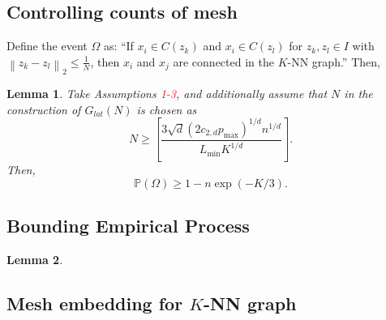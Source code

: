 \documentclass{article}
\newcommand{\norm}[1]{\left\lVert#1\right\rVert}
\newcommand{\1}{\mathbb{I}}
\newcommand{\Pbb}{\mathbb{P}}
\theoremstyle{alden}
\theoremstyle{aldenthm}
\newtheorem{lemma}{Lemma}
\theoremstyle{definition}
\theoremstyle{remark}
\begin{document}
\subsection{Controlling counts of mesh}

Define the event $\Omega$ as: ``If $x_i \in C(z_k)$ and $x_i \in C(z_l)$ for $z_k, z_l \in I$ with $\norm{z_k - z_l}_2 \leq \frac{1}{N}$, then $x_i$ and $x_j$ are connected in the $K$-NN graph.'' Then,
\begin{lemma}
	\label{lem: mesh_counts}
	Take Assumptions \textcolor{red}{1-3}, and additionally assume that $N$ in the construction of $G_{lat}(N)$ is chosen as
	\begin{equation}
	\label{eqn: N_lower_bound}
	N \geq \left[\frac{3\sqrt{d}(2 c_{2,d} p_{\max})^{1/d} n^{1/d}}{L_{\min} K^{1/d}}\right].
	\end{equation}
	Then,
	\begin{equation*}
	\Pbb(\Omega) \geq 1 - n \exp(-K / 3).
	\end{equation*}
\end{lemma}

\subsection{Bounding Empirical Process}

\begin{lemma}
	
\end{lemma}

\subsection{Mesh embedding for $K$-NN graph}
\end{document}

